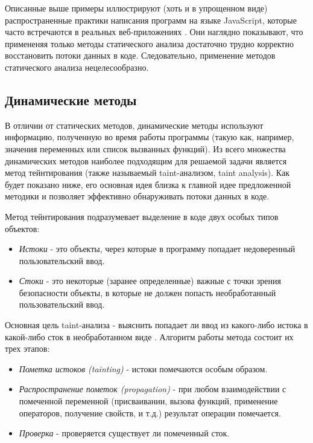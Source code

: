 	Описанные выше примеры иллюстрируют (хоть и в упрощенном виде) распространенные практики написания программ на языке JavaScript, которые часто встречаются в реальных веб-приложениях \cite{Richards2010}. Они наглядно показывают, что примененяя только методы статического анализа достаточно трудно корректно восстановить потоки данных в коде. Следовательно, применение методов статического анализа нецелесообразно.

\subsection{Динамические методы}
	В отличии от статических методов, динамические методы используют информацию, полученную во время работы программы (такую как, например, значения переменных или список вызванных функций). Из всего множества динамических методов наиболее подходящим для решаемой задачи является метод тейнтирования (также называемый taint-анализом, taint analysis). Как будет показано ниже, его основная идея близка к главной идее предложенной методики и позволяет эффективно обнаруживать потоки данных в коде.


	Метод тейнтирования подразумевает выделение в коде двух особых типов объектов:
	\begin{itemize}
		\item \textit{Истоки} - это объекты, через которые в программу попадает недоверенный пользовательский ввод.
		\item \textit{Стоки} - это некоторые (заранее определенные) важные с точки зрения безопасности объекты, в которые не должен попасть необработанный пользовательский ввод.
	\end{itemize}

	Основная цель taint-анализа - выяснить попадает ли ввод из какого-либо истока в какой-либо сток в необработанном виде \cite{miller}. Алгоритм работы метода состоит их трех этапов:

	\begin{itemize}
		\item \textit{Пометка истоков (tainting)} - истоки помечаются особым образом.
		\item \textit{Распространение пометок (propagation)} - при любом взаимодействии с помеченной переменной (присваивании, вызова функций, применение операторов, получение свойств, и т.д.) результат операции помечается.
		\item \textit{Проверка} - проверяется существует ли помеченный сток.
	\end{itemize}


